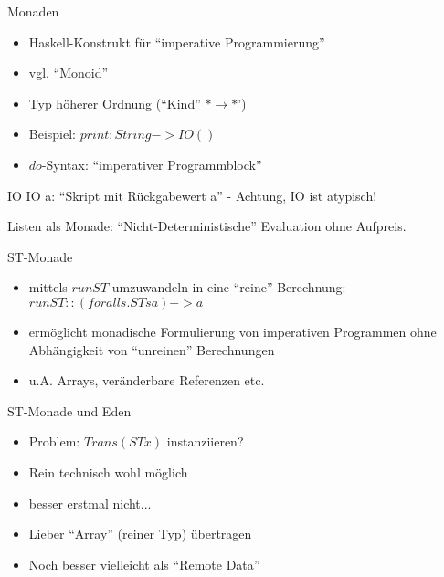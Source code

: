 \documentclass{beamer}
\begin{document}
\begin{frame}{Monaden}
\begin{itemize}
\item Haskell-Konstrukt für ``imperative Programmierung''
\item vgl. ``Monoid''
\item Typ höherer Ordnung (``Kind'' $* \rightarrow *$')
\item Beispiel: $print: String -> IO ()$
\item $do$-Syntax: ``imperativer Programmblock''
\end{itemize}

\begin{definition}{IO}
IO a: ``Skript mit Rückgabewert a'' - Achtung, IO ist atypisch!
\end{definition}

Listen als Monade: ``Nicht-Deterministische'' Evaluation ohne
Aufpreis.

\end{frame}

\begin{frame}{ST-Monade}
\begin{itemize}
\item mittels $runST$ umzuwandeln in eine ``reine'' Berechnung:
  $runST :: (forall s. ST s a) -> a$
\item ermöglicht monadische Formulierung von imperativen Programmen
  ohne Abhängigkeit von ``unreinen'' Berechnungen
\item u.A. Arrays, veränderbare Referenzen etc.
\end{itemize}
\end{frame}

\begin{frame}{ST-Monade und Eden}
\begin{itemize}
\item Problem: $Trans (ST x)$ instanziieren?
\item Rein technisch wohl möglich
\item besser erstmal nicht...
\end{itemize}
\end{frame}

\begin{frame}
\begin{itemize}
\item Lieber ``Array'' (reiner Typ) übertragen
\item Noch besser vielleicht als ``Remote Data''
\end{itemize}
\end{frame}
\end{document}
